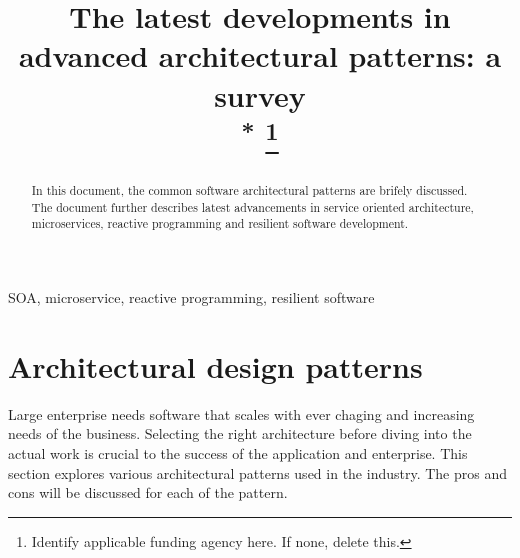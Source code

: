 \documentclass[conference]{IEEEtran}
\begin{document}
\title{The latest developments in advanced architectural patterns: a survey\\
{\footnotesize \textsuperscript{*}}
\thanks{Identify applicable funding agency here. If none, delete this.}
}

\author{
\and
{}
}

\maketitle

\begin{abstract}
In this document, the common software architectural patterns are brifely discussed. The document further describes latest advancements in service oriented architecture, microservices, reactive programming and resilient software development.
\end{abstract}

\begin{IEEEkeywords}
SOA, microservice, reactive programming, resilient software
\end{IEEEkeywords}

\section{Architectural design patterns}
Large enterprise needs software that scales with ever chaging and increasing needs of the business. Selecting the right architecture before diving into the actual work is crucial to the success of the application and enterprise. This section explores various architectural patterns used in the industry. The pros and cons will be discussed for each of the pattern.
\end{document}
